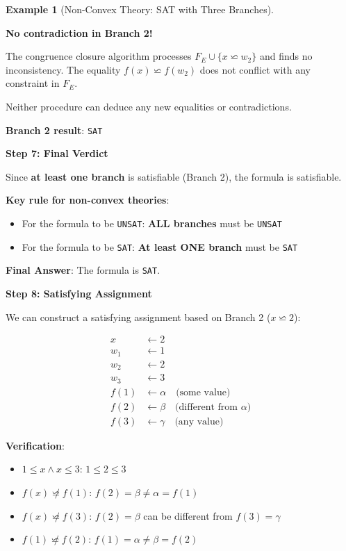 \documentclass[11pt,a4paper]{article}
\theoremstyle{definition}
\newtheorem{example}{Example}[section]
\theoremstyle{plain}
\theoremstyle{remark}
\begin{document}
\begin{example}[Non-Convex Theory: SAT with Three Branches]
\begin{tcolorbox}[colback=green!5!white,colframe=green!75!black,title=\textbf{Example 4: Non-Convex $\mathcal{T}_{\text{LIA}}$ — One SAT Branch Suffices},breakable]
\textbf{No contradiction in Branch 2!}

The congruence closure algorithm processes $F_E \cup \{x \backsimeq w_2\}$ and finds no inconsistency. The equality $f(x) \backsimeq f(w_2)$ does not conflict with any constraint in $F_E$.

Neither procedure can deduce any new equalities or contradictions.

\textbf{Branch 2 result}: \texttt{SAT}

\vspace{0.5em}

\textbf{Step 7: Final Verdict}

Since \textbf{at least one branch} is satisfiable (Branch 2), the formula is satisfiable.

\textbf{Key rule for non-convex theories}:
\begin{itemize}
    \item For the formula to be \texttt{UNSAT}: \textbf{ALL branches} must be \texttt{UNSAT}
    \item For the formula to be \texttt{SAT}: \textbf{At least ONE branch} must be \texttt{SAT}
\end{itemize}

\vspace{0.5em}

\textbf{Final Answer}: The formula is \texttt{SAT}.

\vspace{0.5em}

\textbf{Step 8: Satisfying Assignment}

We can construct a satisfying assignment based on Branch 2 ($x \backsimeq 2$):

\begin{align*}
x &\leftarrow 2 \\
w_1 &\leftarrow 1 \\
w_2 &\leftarrow 2 \\
w_3 &\leftarrow 3 \\
f(1) &\leftarrow \alpha \quad \text{(some value)} \\
f(2) &\leftarrow \beta \quad \text{(different from } \alpha \text{)} \\
f(3) &\leftarrow \gamma \quad \text{(any value)}
\end{align*}

\textbf{Verification}:
\begin{itemize}
    \item $1 \leq x \wedge x \leq 3$: $1 \leq 2 \leq 3$ \checkmark
    \item $f(x) \not\backsimeq f(1)$: $f(2) = \beta \neq \alpha = f(1)$ \checkmark
    \item $f(x) \not\backsimeq f(3)$: $f(2) = \beta$ can be different from $f(3) = \gamma$ \checkmark
    \item $f(1) \not\backsimeq f(2)$: $f(1) = \alpha \neq \beta = f(2)$ \checkmark
\end{itemize}


\end{tcolorbox}
\end{example}
\end{document}
